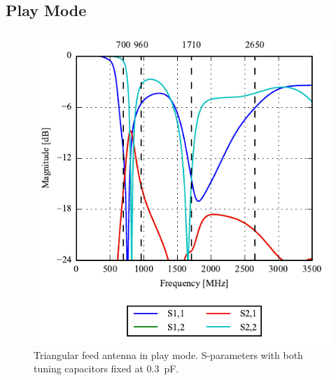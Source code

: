 \subsection{Play Mode}

\begin{figure}[htbp]
    \centering
    \includegraphics{img/tech_sol/trianglefeed/play_mode/sparams.pdf}
    \caption{Triangular feed antenna in play mode. S-parameters with both tuning capacitors fixed at \SI{0.3}{pF}.}
    \label{fig:triang_sparam_play}
\end{figure}

